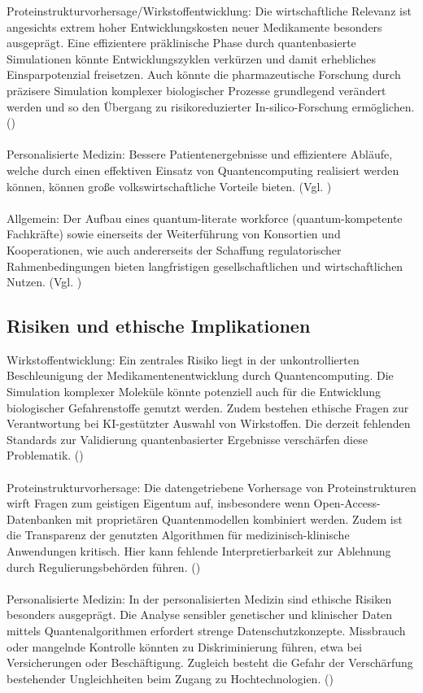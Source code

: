 Proteinstrukturvorhersage/Wirkstoffentwicklung:
Die wirtschaftliche Relevanz ist angesichts extrem hoher Entwicklungskosten neuer Medikamente besonders ausgeprägt. Eine effizientere präklinische Phase durch quantenbasierte Simulationen könnte Entwicklungszyklen verkürzen und damit erhebliches Einsparpotenzial freisetzen. Auch könnte die pharmazeutische Forschung durch präzisere Simulation komplexer biologischer Prozesse grundlegend verändert werden und so den Übergang zu risikoreduzierter In-silico-Forschung ermöglichen. (\cite{dhande_quantum_2023})\\
\\
Personalisierte Medizin:
Bessere Patientenergebnisse und effizientere Abläufe, welche durch einen effektiven Einsatz von Quantencomputing realisiert werden können, können große volkswirtschaftliche Vorteile bieten. (Vgl. \cite{jeyaraman_revolutionizing_2024})\\
\\
Allgemein: 
Der Aufbau eines quantum-literate workforce (quantum-kompetente Fachkräfte) sowie einerseits der Weiterführung von Konsortien und Kooperationen, wie auch andererseits der Schaffung regulatorischer Rahmenbedingungen bieten langfristigen gesellschaftlichen und wirtschaftlichen Nutzen. (Vgl. \cite{jeyaraman_revolutionizing_2024})

\subsection{Risiken und ethische Implikationen}

Wirkstoffentwicklung:
Ein zentrales Risiko liegt in der unkontrollierten Beschleunigung der Medikamentenentwicklung durch Quantencomputing. Die Simulation komplexer Moleküle könnte potenziell auch für die Entwicklung biologischer Gefahrenstoffe genutzt werden. Zudem bestehen ethische Fragen zur Verantwortung bei KI-gestützter Auswahl von Wirkstoffen. Die derzeit fehlenden Standards zur Validierung quantenbasierter Ergebnisse verschärfen diese Problematik. (\cite{flother_state_2023})\\
\\
Proteinstrukturvorhersage:  
Die datengetriebene Vorhersage von Proteinstrukturen wirft Fragen zum geistigen Eigentum auf, insbesondere wenn Open-Access-Datenbanken mit proprietären Quantenmodellen kombiniert werden. Zudem ist die Transparenz der genutzten Algorithmen für medizinisch-klinische Anwendungen kritisch. Hier kann fehlende Interpretierbarkeit zur Ablehnung durch Regulierungsbehörden führen. (\cite{doga_perspective_2024})\\
\\
Personalisierte Medizin:
In der personalisierten Medizin sind ethische Risiken besonders ausgeprägt. Die Analyse sensibler genetischer und klinischer Daten mittels Quantenalgorithmen erfordert strenge Datenschutzkonzepte. Missbrauch oder mangelnde Kontrolle könnten zu Diskriminierung führen, etwa bei Versicherungen oder Beschäftigung. Zugleich besteht die Gefahr der Verschärfung bestehender Ungleichheiten beim Zugang zu Hochtechnologien. (\cite{jeyaraman_revolutionizing_2024})

